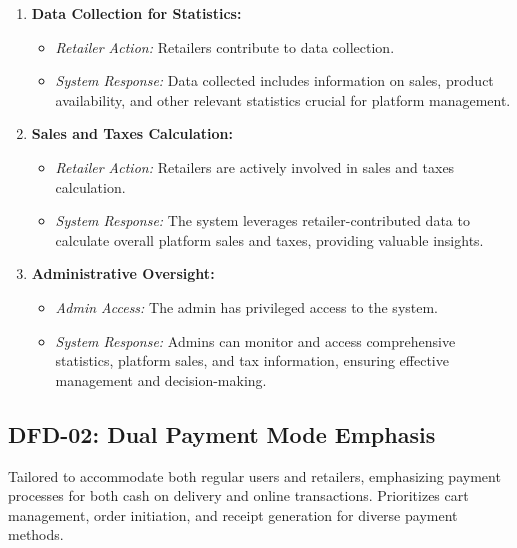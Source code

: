 \documentclass[a4paper,12pt]{article}
\begin{document}
\begin{enumerate}
\item \textbf{Data Collection for Statistics:}
   \begin{itemize}
      \item \textit{Retailer Action:} Retailers contribute to data collection.
      \item \textit{System Response:} Data collected includes information on sales, product availability, and other relevant statistics crucial for platform management.
   \end{itemize}

\item \textbf{Sales and Taxes Calculation:}
   \begin{itemize}
      \item \textit{Retailer Action:} Retailers are actively involved in sales and taxes calculation.
      \item \textit{System Response:} The system leverages retailer-contributed data to calculate overall platform sales and taxes, providing valuable insights.
   \end{itemize}

\item \textbf{Administrative Oversight:}
   \begin{itemize}
      \item \textit{Admin Access:} The admin has privileged access to the system.
      \item \textit{System Response:} Admins can monitor and access comprehensive statistics, platform sales, and tax information, ensuring effective management and decision-making.
   \end{itemize}

\end{enumerate}


\subsection{DFD-02: Dual Payment Mode Emphasis}

Tailored to accommodate both regular users and retailers, emphasizing payment processes for both cash on delivery and online transactions. Prioritizes cart management, order initiation, and receipt generation for diverse payment methods.
\end{document}
